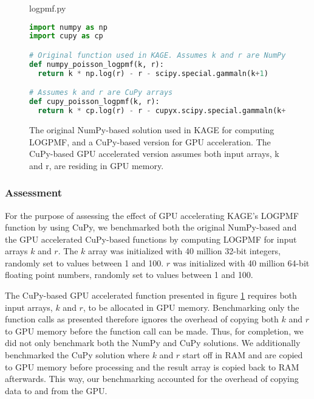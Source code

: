 \begin{figure}[H] 
\begin{center}
logpmf.py
\end{center}
\begin{lstlisting}[language=Python,style=pycode]
import numpy as np
import cupy as cp

# Original function used in KAGE. Assumes k and r are NumPy arrays
def numpy_poisson_logpmf(k, r):
  return k * np.log(r) - r - scipy.special.gammaln(k+1) 

# Assumes k and r are CuPy arrays
def cupy_poisson_logpmf(k, r):
  return k * cp.log(r) - r - cupyx.scipy.special.gammaln(k+1) 
\end{lstlisting}
\caption{
  The original NumPy-based solution used in KAGE for computing LOGPMF, and a CuPy-based version for GPU acceleration.
  The CuPy-based GPU accelerated version assumes both input arrays, k and r, are residing in GPU memory.
}
\label{methods:gpu_accelerating_genotyping:figures:logpmf_array_implementations}
\end{figure}

\subsubsection{Assessment} \label{methods:gpu_accelerating_genotyping:cupy_logpmf_assessment}
For the purpose of assessing the effect of GPU accelerating KAGE's LOGPMF function by using CuPy, we benchmarked both the original NumPy-based and the GPU accelerated CuPy-based functions by computing LOGPMF for input arrays $k$ and $r$.
The $k$ array was initialized with 40 million 32-bit integers, randomly set to values between 1 and 100.
$r$ was initialized with 40 million 64-bit floating point numbers, randomly set to values between 1 and 100.

The CuPy-based GPU accelerated function presented in figure \ref{methods:gpu_accelerating_genotyping:figures:logpmf_array_implementations} requires both input arrays, $k$ and $r$, to be allocated in GPU memory.
Benchmarking only the function calls as presented therefore ignores the overhead of copying both $k$ and $r$ to GPU memory before the function call can be made.
Thus, for completion, we did not only benchmark both the NumPy and CuPy solutions. We additionally benchmarked the CuPy solution where $k$ and $r$ start off in RAM and are copied to GPU memory before processing and the result array is copied back to RAM afterwards. 
This way, our benchmarking accounted for the overhead of copying data to and from the GPU.

